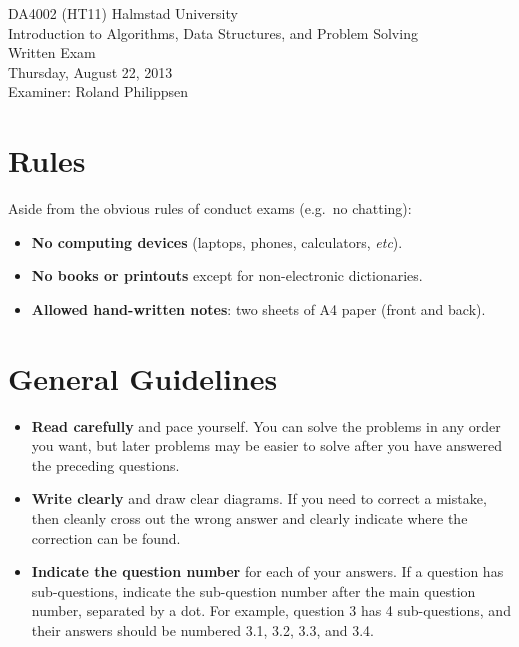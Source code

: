 \documentclass[a4paper]{article}
\newcounter{question}
\begin{document}
\pagestyle{empty}
\thispagestyle{empty}



\noindent
\begin{minipage}{\columnwidth}
  \centering
  \Large
  DA4002 (HT11) Halmstad University\\
  Introduction to Algorithms, Data Structures, and Problem Solving\\[3\baselineskip]
  \Huge
  Written Exam\\
  \Large
  Thursday, August 22, 2013\\[2\baselineskip]
  Examiner: Roland Philippsen
\end{minipage}

\vfill

\noindent
\begin{center}
\end{center}

\vfill



\section*{Rules}

Aside from the obvious rules of conduct exams (e.g.\ no chatting):

\begin{itemize}
\item
  \textbf{No computing devices} (laptops, phones, calculators, \emph{etc}).
\item
  \textbf{No books or printouts} except for non-electronic dictionaries.
\item
  \textbf{Allowed hand-written notes}: two sheets of A4 paper (front and back).
\end{itemize}



\section*{General Guidelines}

\begin{itemize}
\item
  \textbf{Read carefully} and pace yourself.
  You can solve the problems in any order you want, but later problems may be easier to solve after you have answered the preceding questions.
\item
  \textbf{Write clearly} and draw clear diagrams.
  If you need to correct a mistake, then cleanly cross out the wrong answer and clearly indicate where the correction can be found.
\item
  \textbf{Indicate the question number} for each of your answers.
  If a question has sub-questions, indicate the sub-question number after the main question number, separated by a dot.
  For example, question 3 has 4 sub-questions, and their answers should be numbered 3.1, 3.2, 3.3, and 3.4.
\end{itemize}
\end{document}
